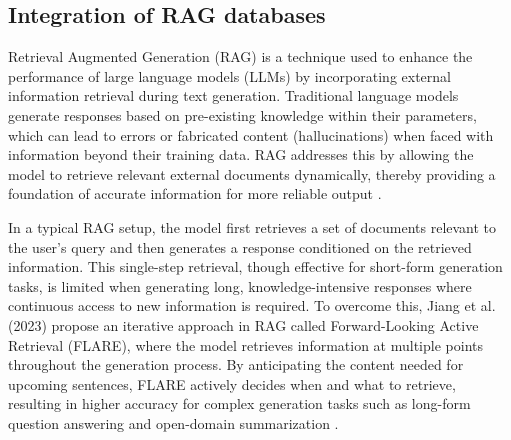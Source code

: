\subsection{Integration of RAG databases}
Retrieval Augmented Generation (RAG) is a technique used to enhance the performance of large language models (LLMs) by incorporating external information retrieval during text generation. Traditional language models generate responses based on pre-existing knowledge within their parameters, which can lead to errors or fabricated content (hallucinations) when faced with information beyond their training data. RAG addresses this by allowing the model to retrieve relevant external documents dynamically, thereby providing a foundation of accurate information for more reliable output \cite{jiang2023}.

In a typical RAG setup, the model first retrieves a set of documents relevant to the user’s query and then generates a response conditioned on the retrieved information. This single-step retrieval, though effective for short-form generation tasks, is limited when generating long, knowledge-intensive responses where continuous access to new information is required. To overcome this, Jiang et al. (2023) propose an iterative approach in RAG called Forward-Looking Active Retrieval (FLARE), where the model retrieves information at multiple points throughout the generation process. By anticipating the content needed for upcoming sentences, FLARE actively decides when and what to retrieve, resulting in higher accuracy for complex generation tasks such as long-form question answering and open-domain summarization \cite{jiang2023}.
